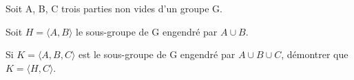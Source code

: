 Soit A, B, C trois parties non vides d'un groupe G. 

Soit $H = \langle A, B \rangle$ le sous-groupe de G engendré par $A \cup B$.

Si $K = \langle A, B, C \rangle$ est le sous-groupe de G engendré par $A \cup B \cup C$, démontrer que $K = \langle H, C \rangle$.